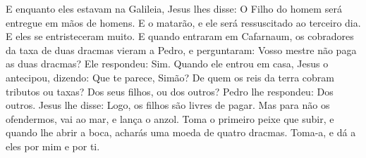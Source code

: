 {  E enquanto eles estavam na Galileia, Jesus lhes disse: O Filho do homem será entregue em mãos de homens.
  E o matarão, e ele será ressuscitado ao terceiro dia. E eles se entristeceram muito.
  E quando entraram em Cafarnaum, os cobradores da taxa de duas dracmas
 vieram a Pedro, e perguntaram: Vosso mestre não paga as duas dracmas?
  Ele respondeu: Sim. Quando ele entrou em casa, Jesus o antecipou, dizendo: Que te parece, Simão? De quem os reis da terra cobram tributos ou taxas? Dos seus filhos, ou dos outros?
  Pedro lhe respondeu: Dos outros. Jesus lhe disse: Logo, os filhos são livres de pagar.
  Mas para não os ofendermos, vai ao mar, e lança o anzol. Toma o primeiro peixe que subir, e quando lhe abrir a boca, acharás uma moeda de quatro dracmas. Toma-a, e dá a eles por mim e por ti.
\par }

